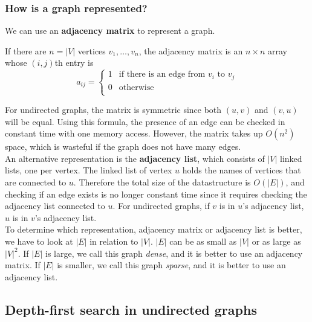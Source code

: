 \subsubsection{How is a graph represented?}
We can use an \textbf{adjacency matrix} to represent a graph.
\begin{definition}
  If there are $n = |V|$ vertices $v_1, \dots, v_n$, the adjacency matrix is an $n \times n$ array whose $(i, j)$th entry is
  $$a_{ij} = \begin{cases}
    1 & \text{if there is an edge from $v_i$ to $v_j$} \\
    0 & \text{otherwise} \\
  \end{cases}$$
\end{definition}
For undirected graphs, the matrix is symmetric since both $(u, v)$ and $(v, u)$ will be equal.
Using this formula, the presence of an edge can be checked in constant time with one memory access.
However, the matrix takes up $O(n^2)$ space, which is wasteful if the graph does not have many edges. \\
An alternative representation is the \textbf{adjacency list}, which consists of $|V|$ linked lists, one per vertex.
The linked list of vertex $u$ holds the names of vertices that are connected to $u$.
Therefore the total size of the datastructure is $O(|E|)$, and checking if an edge exists is no longer constant time since it requires checking the adjacency list connected to $u$.
For undirected graphs, if $v$ is in $u$'s adjacency list, $u$ is in $v$'s adjacency list.\\

To determine which representation, adjacency matrix or adjacency list is better, we have to look at $|E|$ in relation to $|V|$.
$|E|$ can be as small as $|V|$ or as large as $|V|^2$.
If $|E|$ is large, we call this graph \textit{dense}, and it is better to use an adjacency matrix.
If $|E|$ is smaller, we call this graph \textit{sparse}, and it is better to use an adjacency list.

\subsection{Depth-first search in undirected graphs}

